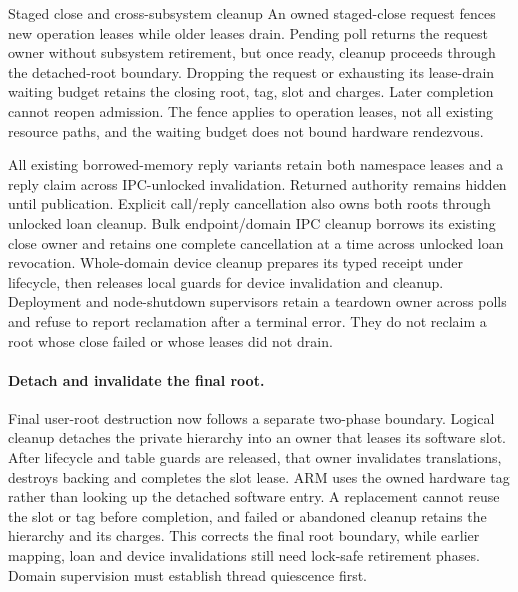 \begin{implementationdetail}{Staged close and cross-subsystem cleanup}
An owned staged-close request fences new operation
leases while older leases drain. Pending poll returns
the request owner without subsystem retirement, but once ready, cleanup proceeds
through the detached-root boundary. Dropping the request or exhausting its
lease-drain waiting budget retains the closing root, tag, slot and charges.
Later completion cannot reopen admission. The fence applies to operation leases,
not all existing resource paths, and the waiting budget does not bound hardware
rendezvous.

All existing borrowed-memory reply variants retain both namespace
leases and a reply claim across IPC-unlocked invalidation. Returned authority
remains hidden until publication. Explicit call/reply cancellation also owns both
roots through unlocked loan cleanup. Bulk endpoint/domain IPC cleanup borrows
its existing close owner and retains one complete cancellation at a time across
unlocked loan revocation. Whole-domain device cleanup prepares its typed receipt
under lifecycle, then releases local guards for device invalidation and cleanup.
Deployment and node-shutdown
supervisors retain a teardown owner across polls and refuse
to report reclamation after a terminal error. They do not reclaim a root whose
close failed or whose leases did not drain.
\end{implementationdetail}

\paragraph*{Detach and invalidate the final root.}

Final user-root destruction now follows a separate two-phase boundary. Logical
cleanup detaches the private hierarchy into an owner that leases its software
slot. After lifecycle and table guards are released, that owner invalidates
translations, destroys backing and completes the slot lease. ARM uses the owned
hardware tag rather than looking up the detached software entry. A replacement
cannot reuse the slot or tag before completion, and failed or abandoned cleanup
retains the hierarchy and its charges. This corrects the final root boundary,
while earlier mapping, loan and device invalidations still need lock-safe
retirement phases. Domain supervision must establish thread quiescence first.

